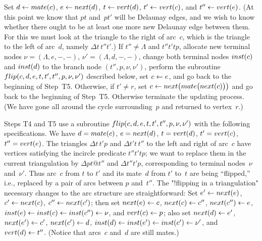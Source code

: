 \quad
Set $d\leftarrow{\sl mate\/}(c)$, $e\leftarrow{\sl next\/}(d)$, $t\leftarrow{\sl
vert\/}(d)$, $t'\leftarrow{\sl vert\/}(c)$, and $t''\leftarrow{\sl vert\/}(e)$. (At
this point we know that $pt$ and~$pt'$ will be Delaunay edges, and we
wish to know whether there ought to be at least one more new Delaunay
edge between them. For this we must look at the triangle to the right
of arc~$c$, which is the triangle to the left of arc~$d$, namely
$\Delta t\,t''t'$.) If $t''\neq\Lambda$ and $t''t'tp$, allocate new
terminal nodes $\nu=(\Lambda,e,-,-)$, $\nu'=(\Lambda,d,-,-)$, change
both terminal nodes ${\sl inst\/}(c)$ and ${\sl inst\/}(d)$ to the
branch node $(t'',p,\nu,\nu')$, perform the subroutine ${\sl
flip\/}(c,d,e,t,t',t'',p,\nu,\nu')$ described below, set $c\leftarrow e$, and
go back to the beginning of Step~T5. Otherwise, if $t'\neq r$, set
$c\leftarrow{\sl next\/}\bigl({\sl mate\/}\bigl({\sl next\/}(c)\bigr)\bigr)$
and go back to the beginning of Step~T5. Otherwise terminate the
updating process. (We have gone all around the cycle surrounding~$p$
and returned to vertex~$r$.)\quad\pfbox

\bigskip
Steps T4 and T5 use a subroutine ${\sl
flip\/}(c,d,e,t,t',t'',p,\nu,\nu')$ with the following specifications.
We have $d={\sl mate\/}(c)$, $e={\sl next\/}(d)$, $t={\sl vert\/}(d)$,
$t'={\sl vert\/}(c)$, $t''={\sl vert\/}(e)$. The triangles $\Delta
t\,t'p$ and $\Delta t't\,t''$ to the left and right of arc~$c$ have
vertices satisfying the incircle predicate $t''t'tp$; we want to
replace them in the current triangulation by $\Delta pt@ t''$ and
$\Delta t''t'p$, corresponding to terminal nodes~$\nu$ and~$\nu'$. Thus
arc~$c$ from $t$ to $t'$ and its mate~$d$ from $t'$ to~$t$ are being
``flipped,'' i.e., replaced by a pair of arcs between $p$ and~$t''$. The
"!flipping in a triangulation"
necessary changes to the arc structure are straightforward: Set
$e'\leftarrow{\sl next\/}(e)$, $c'\leftarrow{\sl next\/}(c)$, $c''\leftarrow{\sl
next\/}(c')$; then set ${\sl next\/}(e)\leftarrow c$, ${\sl next\/}(c)\leftarrow
c''$, ${\sl next\/}(c'')\leftarrow e$, ${\sl inst\/}(e)\leftarrow{\sl
inst\/}(c)\leftarrow{\sl inst\/}(c'')\leftarrow\nu$, and ${\sl vert\/}(c)\leftarrow p$;
also set ${\sl next\/}(d)\leftarrow e'$, ${\sl next\/}(e')\leftarrow c'$, ${\sl
next\/}(c')\leftarrow d$, ${\sl inst\/}(d)\leftarrow{\sl inst\/}(e')\leftarrow{\sl
inst\/}(c')\leftarrow\nu'$, and ${\sl vert\/}(d)\leftarrow t''$. (Notice that
arcs~$c$ and~$d$ are still mates.)

